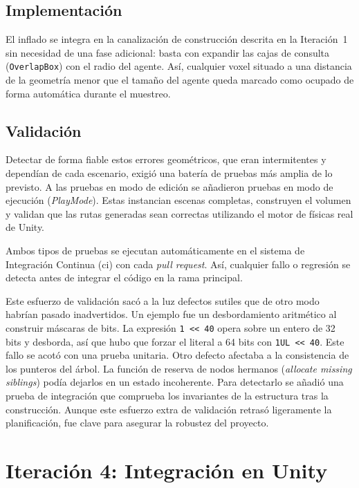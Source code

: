 \subsection{Implementación}

El inflado se integra en la canalización de construcción descrita en la Iteración~1 sin necesidad de una fase adicional: basta con expandir las cajas de consulta (\texttt{OverlapBox}) con el radio del agente.
Así, cualquier \gls{voxel} situado a una distancia de la geometría menor que el tamaño del agente queda marcado como ocupado de forma automática durante el muestreo.

\subsection{Validación}

Detectar de forma fiable estos errores geométricos, que eran intermitentes y dependían de cada escenario, exigió una batería de pruebas más amplia de lo previsto.
A las pruebas en modo de edición se añadieron pruebas en modo de ejecución (\textit{PlayMode}).
Estas instancian escenas completas, construyen el volumen y validan que las rutas generadas sean correctas utilizando el motor de físicas real de Unity.

Ambos tipos de pruebas se ejecutan automáticamente en el sistema de Integración Continua (\acrshort{ci}) con cada \textit{pull request}.
Así, cualquier fallo o regresión se detecta antes de integrar el código en la rama principal.

Este esfuerzo de validación sacó a la luz defectos sutiles que de otro modo habrían pasado inadvertidos.
Un ejemplo fue un desbordamiento aritmético al construir máscaras de bits.
La expresión \texttt{1 << 40} opera sobre un entero de 32 bits y desborda, así que hubo que forzar el literal a 64 bits con \texttt{1UL << 40}.
Este fallo se acotó con una prueba unitaria.
Otro defecto afectaba a la consistencia de los punteros del árbol.
La función de reserva de nodos hermanos (\textit{allocate missing siblings}) podía dejarlos en un estado incoherente.
Para detectarlo se añadió una prueba de integración que comprueba los invariantes de la estructura tras la construcción.
Aunque este esfuerzo extra de validación retrasó ligeramente la planificación, fue clave para asegurar la robustez del proyecto.

\section{Iteración 4: Integración en Unity}
\label{sec:iter-integracion}


